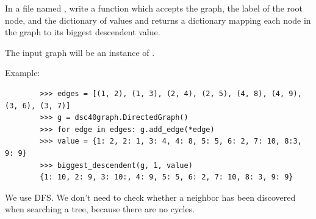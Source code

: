 \begin{progprob}
    In a file named ,
    write a function  which accepts
    the graph, the label of the root node, and the dictionary of values and returns
    a dictionary mapping each node in the graph to its biggest descendent value.

    The input graph will be an instance of .

    Example:

    \begin{verbatim}
        >>> edges = [(1, 2), (1, 3), (2, 4), (2, 5), (4, 8), (4, 9), (3, 6), (3, 7)]
        >>> g = dsc40graph.DirectedGraph()
        >>> for edge in edges: g.add_edge(*edge)
        >>> value = {1: 2, 2: 1, 3: 4, 4: 8, 5: 5, 6: 2, 7: 10, 8:3, 9: 9}
        >>> biggest_descendent(g, 1, value)
        {1: 10, 2: 9, 3: 10:, 4: 9, 5: 5, 6: 2, 7: 10, 8: 3, 9: 9}
    \end{verbatim}

    \begin{soln}
        We use DFS. We don't need to check whether a neighbor has been discovered
        when searching a tree, because there are no cycles.

        \inputminted{python}{\thisdir/include-solution/biggest_descendent.py}
    \end{soln}
\end{progprob}
